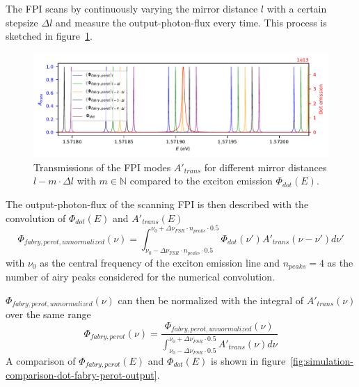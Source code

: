 The \ac{FPI} scans by continuously varying the mirror distance $l$ with a certain stepsize $\Delta l$ and measure the output-photon-flux every time.
This process is sketched in figure~\ref{fig:simulation-comparison-dot-fabry-perot-sweep}.

\begin{figure}[H]
	\centering
	\includegraphics[width=\linewidth]{figures/fabry-perot/plots/simulation-comparison-dot-fabry-perot-sweep}
	\caption{Transmissions of the FPI modes $A'_{trans}$ for different mirror distances $l - m \cdot \Delta l$ with $m \in \mathbb{N}$ compared to the exciton emission $\Phi_{dot}(E)$.}
	\label{fig:simulation-comparison-dot-fabry-perot-sweep}
\end{figure}


The output-photon-flux of the scanning \ac{FPI} is then described with the convolution of $\Phi_{dot}(E)$ and $A'_{trans}(E)$
\begin{equation}
\Phi_{fabry,perot, unnormalized}(\nu) = \int^{\nu_0 + \Delta \nu_{FSR} \cdot n_{peaks} \cdot 0.5}_{\nu_0 - \Delta \nu_{FSR} \cdot n_{peaks}\cdot 0.5}  \Phi_{dot}(\nu')A'_{trans}(\nu - \nu') d\nu'
\end{equation}
with $\nu_0$ as the central frequency of the exciton emission line and $n_{peaks}=4$ as the number of airy peaks considered for the numerical convolution.

$\Phi_{fabry,perot,unnormalized}(\nu)$ can then be normalized with the integral of $A'_{trans}(\nu)$ over the same range
\begin{equation}
\Phi_{fabry,perot}(\nu) =\frac{\Phi_{fabry,perot, unnormalized}(\nu)}{\int^{\nu_0 + \Delta \nu_{FSR}  \cdot 0.5}_{\nu_0 - \Delta \nu_{FSR}  \cdot 0.5} A'_{trans}(\nu) d\nu}
\end{equation}
A comparison of $\Phi_{fabry,perot}(E)$ and $\Phi_{dot}(E)$ is shown in figure~\ref{fig:simulation-comparison-dot-fabry-perot-output}.

